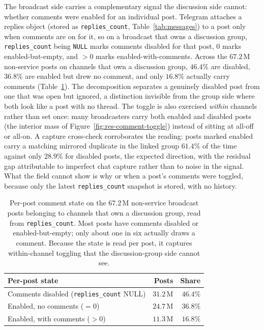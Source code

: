 The broadcast side carries a complementary signal the discussion side cannot: whether comments were enabled for an individual post. Telegram attaches a replies object (stored as \texttt{replies\_count}, Table~\ref{tab:messages}) to a post only when comments are on for it, so on a broadcast that owns a discussion group, \texttt{replies\_count} being \texttt{NULL} marks comments disabled for that post, $0$ marks enabled-but-empty, and $>0$ marks enabled-with-comments. Across the $67.2$\,M non-service posts on channels that own a discussion group, $46.4\%$ are disabled, $36.8\%$ are enabled but drew no comment, and only $16.8\%$ actually carry comments (Table~\ref{tab:res-comment-toggle}). The decomposition separates a genuinely disabled post from one that was open but ignored, a distinction invisible from the group side where both look like a post with no thread. The toggle is also exercised \emph{within} channels rather than set once: many broadcasters carry both enabled and disabled posts (the interior mass of Figure~\ref{fig:res-comment-toggle}) instead of sitting at all-off or all-on. A capture cross-check corroborates the reading: posts marked enabled carry a matching mirrored duplicate in the linked group $61.4\%$ of the time against only $28.9\%$ for disabled posts, the expected direction, with the residual gap attributable to imperfect chat capture rather than to noise in the signal. What the field cannot show is why or when a post's comments were toggled, because only the latest \texttt{replies\_count} snapshot is stored, with no history.

\begin{table}[htbp]
\centering
\caption[Per-post comment toggle.]{Per-post comment state on the $67.2$\,M non-service broadcast posts belonging to channels that own a discussion group, read from \texttt{replies\_count}. Most posts have comments disabled or enabled-but-empty; only about one in six actually draws a comment. Because the state is read per post, it captures within-channel toggling that the discussion-group side cannot see.}
\label{tab:res-comment-toggle}
\small
\setlength{\tabcolsep}{6pt}
\begin{tabular}{@{}lrr@{}}
\toprule
\textbf{Per-post state} & \textbf{Posts} & \textbf{Share} \\
\midrule
Comments disabled (\texttt{replies\_count} NULL) & $31.2$\,M & $46.4\%$ \\
Enabled, no comments ($=0$)                       & $24.7$\,M & $36.8\%$ \\
Enabled, with comments ($>0$)                     & $11.3$\,M & $16.8\%$ \\
\bottomrule
\end{tabular}
\end{table}

